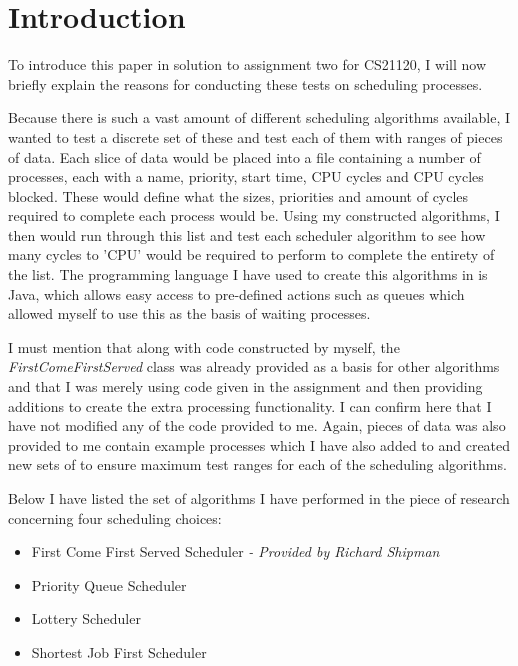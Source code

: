 \documentclass{sig-alternate}
\begin{document}

\section{Introduction}
To introduce this paper in solution to assignment two for CS21120, I will now
briefly explain the reasons for conducting these tests on scheduling processes. 

Because there is such a vast amount of different scheduling algorithms
available, I wanted to test a discrete set of these and test each of them with
ranges of pieces of data. Each slice of data would be placed into a file
containing a number of processes, each with a name, priority, start time, CPU
cycles and CPU cycles blocked. These would define what the sizes, priorities and
amount of cycles required to complete each process would be. Using my
constructed algorithms, I then would run through this list and test each
scheduler algorithm to see how many cycles to 'CPU' would be required to perform
to complete the entirety of the list. The programming language I have used to
create this algorithms in is Java, which allows easy access to pre-defined
actions such as queues which allowed myself to use this as the basis of waiting
processes.

I must mention that along with code constructed by myself, the
\textit{FirstComeFirstServed} class was already provided as a basis for other
algorithms and that I was merely using code given in the assignment and then
providing additions to create the extra processing functionality. I can confirm
here that I have not modified any of the code provided to me. Again, pieces of
data was also provided to me contain example processes which I have also added
to and created new sets of to ensure maximum test ranges for each of the
scheduling algorithms.
\vspace{3mm}

Below I have listed the set of algorithms I have performed in the piece of
research concerning four scheduling choices:

\begin{itemize}
\item{First Come First Served Scheduler \textit{ - Provided by Richard Shipman}}
\item{Priority Queue Scheduler}
\item{Lottery Scheduler}
\item{Shortest Job First Scheduler}
\end{itemize}
\end{document}
